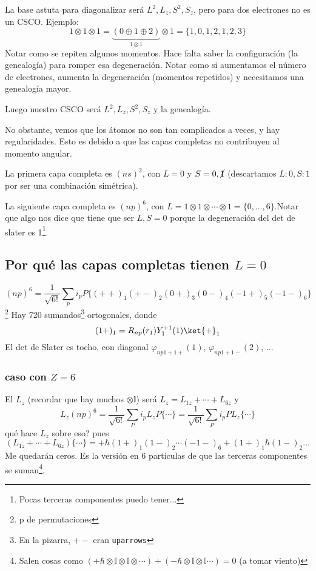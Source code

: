 La base astuta para diagonalizar será $L^2,L_z,S^2,S_z$, pero para
dos electrones no es un CSCO. Ejemplo:
\begin{equation}
  1 \otimes 1 \otimes 1 = \underbrace{(0 \oplus 1 \oplus 2)}_{1\otimes
  1} \otimes 1 = \{1,0,1,2,1,2,3\}
\end{equation}
Notar como se repiten algunos momentos. Hace falta saber la
configuración (la genealogía) para romper esa degeneración. Notar como
si aumentamos el número de electrones, aumenta la degeneración
(momentos repetidos) y necesitamos una genealogía mayor.

Luego nuestro CSCO será $L^2,L_z,S^2,S_z$ y la genealogía.

No obstante, vemos que los átomos no son tan complicados a veces, y
hay regularidades. Esto es debido a que las capas completas no
contribuyen al momento angular.

La primera capa completa es $(ns)^2$, con $L=0$ y $S=0,\cancel{1}$ (descartamos
$L:0,S:1$ por ser una combinación simétrica).

La siguiente capa completa es $(np)^6$, con
$L=1\otimes1\otimes\cdots\otimes1 = \{0,\ldots,6\}$.Notar que algo nos
dice que tiene que ser $L,S=0$ porque la degeneración del det de
slater es 1\footnote{Pocas terceras componentes puedo tener...}.

\subsection{Por qué las capas completas tienen $L=0$}

\begin{equation}
(np)^6 = \frac{1}{\sqrt{6!}} \sum_{p} i_p P\{(++)_1(+-)_2(0+)_3(0-)_4(-1+)_5(-1-)_6\}
\end{equation}\footnote{p de permutaciones}
Hay 720 sumandos\footnote{En la pizarra, $+-$ eran \verb~uparrows~} ortogonales, donde
\begin{equation}
  (1+)_1 = R_{np}(r_1) Y_1^{+1}(1) \ket{+}_1
\end{equation} 
El det de Slater es tocho, con diagonal $\varphi_{np 1+1+}(1)$, $\varphi_{np
1+1-}(2)$, ...

\subsubsection{caso con $Z=6$}
El $L_z$ (recordar que hay muchos $\otimes \mathbb{I}$) será
$L_z=L_{1z}+\cdots+L_{6z}$ y
\begin{equation}
  L_z(np)^6 = \frac{1}{\sqrt{6!}} \sum_{P} i_p L_z P \{\cdots\} =
  \frac{1}{\sqrt{6!}} \sum_{P} i_p P L_z \{\cdots\}
\end{equation}
qué hace $L_z$ sobre eso? pues
\begin{equation}
  (L_{1z}+\cdots+L_{6z}) \{\cdots\} = + \hbar (1+)_1 (1-)_2 \cdots
  (-1-)_6 + (1+)_1 \hbar(1-)_2 \ldots
\end{equation}
Me quedarán ceros. Es la versión en 6 partículas de que las terceras
componentes se suman\footnote{Salen cosas como $(+\hbar \otimes
  \mathbb{I} \otimes \mathbb{I} \otimes \cdots)  +(- \hbar\otimes \mathbb{I} \otimes
  \mathbb{I} \cdots) = 0 $ (\joke a tomar viento)}.

